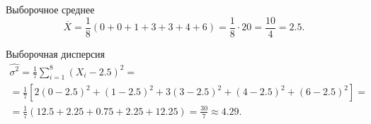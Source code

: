 Выборочное среднее
$$ \overline{X} =
  \frac{1}{8} \left( 0 + 0 + 1 + 3 + 3 + 4 + 6 \right) =
  \frac{1}{8} \cdot 20 =
  \frac{10}{4} =
  2.5.$$

Выборочная дисперсия
\begin{equation*}
\begin{split}
  \hat{ \sigma^2} =
  \frac{1}{7} \sum \limits_{i = 1}^8 \left( X_i - 2.5 \right)^2 = \\
  = \frac{1}{7}
  \left[
    2 \left( 0 - 2.5 \right)^2 +
    \left( 1 - 2.5 \right)^2 +
    3 \left( 3 - 2.5 \right)^2 +
    \left( 4 - 2.5 \right)^2 +
    \left( 6 - 2.5 \right)^2
  \right] = \\
  = \frac{1}{7} \left( 12.5 + 2.25 + 0.75 + 2.25 + 12.25 \right) =
  \frac{30}{7} \approx
  4.29.
\end{split}
\end{equation*}
